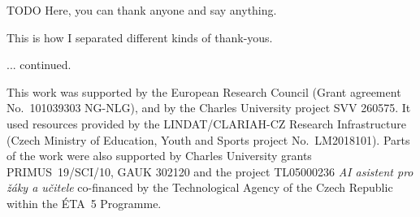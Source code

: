 \documentclass[12pt,notitlepage,a4paper,openright]{report}
\begin{document}
{ TODO Here, you can thank anyone and say anything.

  \vspace{1\baselineskip}
  \noindent
  This is how I separated different kinds of thank-yous.

  \vspace{1\baselineskip}
  \noindent
  ... continued. }

\vfill


{\noindent\footnotesize %
This work was supported by the European Research Council (Grant agreement No.~101039303 NG-NLG),
and by the Charles University project SVV 260575.
It used resources provided by the LINDAT/CLARIAH-CZ Research Infrastructure (Czech Ministry of Education, Youth and Sports project No.~LM2018101).
Parts of the work were also supported by Charles University grants PRIMUS~19/SCI/10, GAUK 302120 and the project TL05000236 \emph{AI asistent pro žáky a učitele} co-financed by the Technological Agency of the Czech Republic within the ÉTA~5 Programme.
}

\cleardoublepage{}
\tableofcontents %

\cleardoublepage{}
\renewcommand{\chapterheadstartvskip}{\vspace*{-10mm}} %

%
%
\renewcommand{\thepage}{\arabic{page}}
\setcounter{page}{1}

\sloppy









%
%

\renewcommand{\chapterheadstartvskip}{\vspace*{0mm}} %

\cleardoublepage{}

{\small }

\cleardoublepage{}
\renewcommand*{\acronymname}{List of Abbreviations}
\printglossary[type=\acronymtype,style=index]

{\small \listoftables\par}

{\small \listoffigures\par}

\cleardoublepage{}

\end{document}
